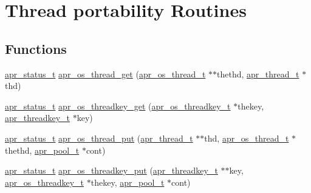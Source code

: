 \hypertarget{group__apr__os__thread}{}\section{Thread portability Routines}
\label{group__apr__os__thread}
\subsection*{Functions}
\begin{DoxyCompactItemize}
\item 
\hyperlink{group__apr__errno_gaf76ee4543247e9fb3f3546203e590a6c}{apr\+\_\+status\+\_\+t} \hyperlink{group__apr__os__thread_gadda5e99fc387491a2a9436bf6144bd49}{apr\+\_\+os\+\_\+thread\+\_\+get} (\hyperlink{group__apr__portabile_ga4ccd9519af148ccf9cff850dd58f00b6}{apr\+\_\+os\+\_\+thread\+\_\+t} $\ast$$\ast$thethd, \hyperlink{group__apr__thread__proc_ga646c71351e723d84f8cc8c8d1d5937be}{apr\+\_\+thread\+\_\+t} $\ast$thd)
\item 
\hyperlink{group__apr__errno_gaf76ee4543247e9fb3f3546203e590a6c}{apr\+\_\+status\+\_\+t} \hyperlink{group__apr__os__thread_ga2fd6ec9d398c4f2564765866c3d31219}{apr\+\_\+os\+\_\+threadkey\+\_\+get} (\hyperlink{group__apr__portabile_ga0a228496d8a1a9b3be744ddb101a3e76}{apr\+\_\+os\+\_\+threadkey\+\_\+t} $\ast$thekey, \hyperlink{group__apr__thread__proc_ga337c9c1bd2d47740022071a5c41f2edb}{apr\+\_\+threadkey\+\_\+t} $\ast$key)
\item 
\hyperlink{group__apr__errno_gaf76ee4543247e9fb3f3546203e590a6c}{apr\+\_\+status\+\_\+t} \hyperlink{group__apr__os__thread_ga7eda58df34fbc11cd251899e575a1b0f}{apr\+\_\+os\+\_\+thread\+\_\+put} (\hyperlink{group__apr__thread__proc_ga646c71351e723d84f8cc8c8d1d5937be}{apr\+\_\+thread\+\_\+t} $\ast$$\ast$thd, \hyperlink{group__apr__portabile_ga4ccd9519af148ccf9cff850dd58f00b6}{apr\+\_\+os\+\_\+thread\+\_\+t} $\ast$thethd, \hyperlink{group__apr__pools_gaf137f28edcf9a086cd6bc36c20d7cdfb}{apr\+\_\+pool\+\_\+t} $\ast$cont)
\item 
\hyperlink{group__apr__errno_gaf76ee4543247e9fb3f3546203e590a6c}{apr\+\_\+status\+\_\+t} \hyperlink{group__apr__os__thread_ga386f6e3e205d422f623132bb50147133}{apr\+\_\+os\+\_\+threadkey\+\_\+put} (\hyperlink{group__apr__thread__proc_ga337c9c1bd2d47740022071a5c41f2edb}{apr\+\_\+threadkey\+\_\+t} $\ast$$\ast$key, \hyperlink{group__apr__portabile_ga0a228496d8a1a9b3be744ddb101a3e76}{apr\+\_\+os\+\_\+threadkey\+\_\+t} $\ast$thekey, \hyperlink{group__apr__pools_gaf137f28edcf9a086cd6bc36c20d7cdfb}{apr\+\_\+pool\+\_\+t} $\ast$cont)
$$
\end{DoxyCompactItemize}
